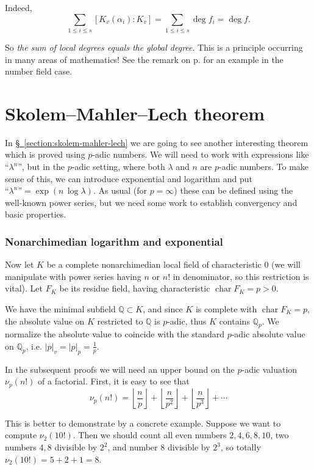 \documentclass{article}
\newcommand{\QQ}{\mathbb{Q}}
\DeclareMathOperator{\fchar}{char}
\newcommand{\refref}[2]{\hyperref[#2]{#1~\ref*{#2}}}
\theoremstyle{myplain}
\theoremstyle{mydefinition}
\begin{document}
Indeed,
\[ \sum_{1 \le i \le s} [K_v (\alpha_i) : K_v] = \sum_{1 \le i \le s} \deg f_i = \deg f. \]

So \emph{the sum of local degrees equals the global degree}. This is a principle
occurring in many areas of mathematics! See the remark on
p. \pageref{remark:local-degrees-global-degree-number-fields} for an example in
the number field case.

\pagebreak

\part{Skolem--Mahler--Lech theorem}

In \refref{\S}{section:skolem-mahler-lech} we are going to see another
interesting theorem which is proved using $p$-adic numbers. We will need to work
with expressions like ``$\lambda^n$'', but in the $p$-adic setting, where both
$\lambda$ and $n$ are $p$-adic numbers. To make sense of this, we can introduce
exponential and logarithm and put
$\text{``}\lambda^n\text{''} = \exp (n\,\log\lambda)$. As usual
(for $p = \infty$) these can be defined using the well-known power series, but
we need some work to establish convergency and basic properties.

\section{Nonarchimedian logarithm and exponential}

Now let $K$ be a complete nonarchimedian local field of characteristic $0$ (we
will manipulate with power series having $n$ or $n!$ in denominator, so this
restriction is vital). Let $F_K$ be its residue field, having characteristic
$\fchar F_K = p > 0$.

We have the minimal subfield $\QQ \subset K$, and since $K$ is complete with
$\fchar F_K = p$, the absolute value on $K$ restricted to $\QQ$ is $p$-adic,
thus $K$ contains $\QQ_p$. We normalize the absolute value to coincide with the
standard $p$-adic absolute value on $\QQ_p$, i.e. $|p|_v = |p|_p = \frac{1}{p}$.

In the subsequent proofs we will need an upper bound on the $p$-adic valuation
$\nu_p (n!)$ of a factorial. First, it is easy to see that
\[ \tag{*} \nu_p (n!) =
  \left\lfloor\frac{n}{p}\right\rfloor +
  \left\lfloor\frac{n}{p^2}\right\rfloor +
  \left\lfloor\frac{n}{p^3}\right\rfloor + \cdots \]

This is better to demonstrate by a concrete example. Suppose we want to compute
$\nu_2 (10!)$. Then we should count all even numbers $2, 4, 6, 8, 10$, two
numbers $4, 8$ divisible by $2^2$, and number $8$ divisible by $2^3$, so totally
$\nu_2 (10!) = 5 + 2 + 1 = 8$.
\end{document}
